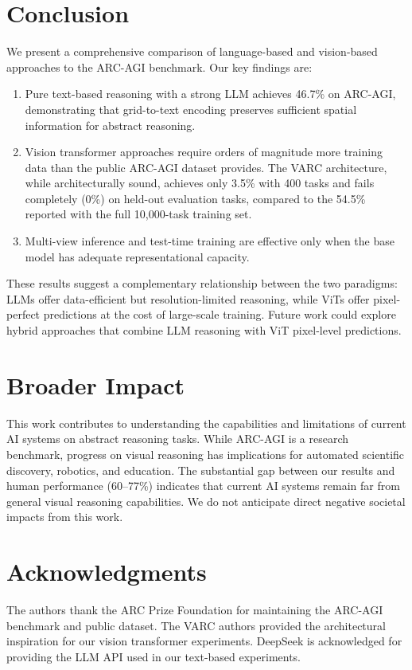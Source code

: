 \documentclass{article}
\begin{document}
\section{Conclusion}

We present a comprehensive comparison of language-based and vision-based approaches to the ARC-AGI benchmark. Our key findings are:

\begin{enumerate}
    \item Pure text-based reasoning with a strong LLM achieves 46.7\% on ARC-AGI, demonstrating that grid-to-text encoding preserves sufficient spatial information for abstract reasoning.
    \item Vision transformer approaches require orders of magnitude more training data than the public ARC-AGI dataset provides. The VARC architecture, while architecturally sound, achieves only 3.5\% with 400 tasks and fails completely (0\%) on held-out evaluation tasks, compared to the 54.5\% reported with the full 10,000-task training set.
    \item Multi-view inference and test-time training are effective only when the base model has adequate representational capacity.
\end{enumerate}

These results suggest a complementary relationship between the two paradigms: LLMs offer data-efficient but resolution-limited reasoning, while ViTs offer pixel-perfect predictions at the cost of large-scale training. Future work could explore hybrid approaches that combine LLM reasoning with ViT pixel-level predictions.

\section*{Broader Impact}
This work contributes to understanding the capabilities and limitations of current AI systems on abstract reasoning tasks. While ARC-AGI is a research benchmark, progress on visual reasoning has implications for automated scientific discovery, robotics, and education. The substantial gap between our results and human performance (60--77\%) indicates that current AI systems remain far from general visual reasoning capabilities. We do not anticipate direct negative societal impacts from this work.

\section*{Acknowledgments}
The authors thank the ARC Prize Foundation for maintaining the ARC-AGI benchmark and public dataset. The VARC authors \cite{arxiv2511.14761} provided the architectural inspiration for our vision transformer experiments. DeepSeek \cite{deepseek2025r1} is acknowledged for providing the LLM API used in our text-based experiments.
\end{document}
